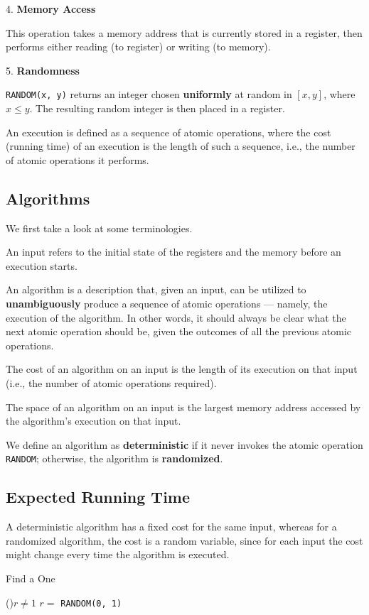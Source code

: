 4. \textbf{Memory Access}

This operation takes a memory address that is currently stored in a register, then performs either reading (to register) or writing (to memory). 

5. \textbf{Randomness} 

\texttt{RANDOM(x, y)} returns an integer chosen \textbf{uniformly} at random in \([x, y]\), where \(x \leq y\). The resulting random integer is then placed in a register.

An execution is defined as a sequence of atomic operations, where the cost (running time) of an execution is the length of such a sequence, i.e., the number of atomic operations it performs.

\subsection{Algorithms}
We first take a look at some terminologies. 

An input refers to the initial state of the registers and the memory before an execution starts.

An algorithm is a description that, given an input, can be utilized to \textbf{unambiguously} produce a sequence of atomic operations — namely, the execution of the algorithm. In other words, it should always be clear what the next atomic operation should be, given the outcomes of all the previous atomic operations.

The cost of an algorithm on an input is the length of its execution on that input (i.e., the number of atomic operations required).

The space of an algorithm on an input is the largest memory address accessed by the algorithm’s execution on that input.

We define an algorithm as \textbf{deterministic} if it never invokes the atomic operation \texttt{RANDOM}; otherwise, the algorithm is \textbf{randomized}. 

\subsection{Expected Running Time}
A deterministic algorithm has a fixed cost for the same input, whereas for a randomized algorithm, the cost is a random variable, since for each input the cost might change every time the algorithm is executed. 

\begin{algorithm}[H]
	\DontPrintSemicolon{}
	\caption{Find a One}
	\BlankLine
	\While(){\(r \neq 1\)}{
		\(r = \) \texttt{RANDOM(0, 1)}
	}
	\;
\end{algorithm}

